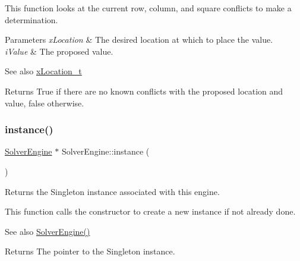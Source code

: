 This function looks at the current row, column, and square conflicts to make a determination. 
\begin{DoxyParams}{Parameters}
{\em x\+Location} & The desired location at which to place the value. \\
\hline
{\em i\+Value} & The proposed value. \\
\hline
\end{DoxyParams}
\begin{DoxySeeAlso}{See also}
\mbox{\hyperlink{struct_solver_engine_1_1x_location__t}{x\+Location\+\_\+t}} 
\end{DoxySeeAlso}
\begin{DoxyReturn}{Returns}
True if there are no known conflicts with the proposed location and value, false otherwise. 
\end{DoxyReturn}
\mbox{\label{class_solver_engine_abc1e088d35a6702a58c57e3344348eab}} 
\subsubsection{\texorpdfstring{instance()}{instance()}}
{\footnotesize\ttfamily \mbox{\hyperlink{class_solver_engine}{Solver\+Engine}} $\ast$ Solver\+Engine\+::instance (\begin{DoxyParamCaption}{ }\end{DoxyParamCaption})\hspace{0.3cm}{\ttfamily [static]}}



Returns the Singleton instance associated with this engine. 

This function calls the constructor to create a new instance if not already done. \begin{DoxySeeAlso}{See also}
\mbox{\hyperlink{class_solver_engine_a677b5fe26a9eea0dea994cc3f9027211}{Solver\+Engine()}} 
\end{DoxySeeAlso}
\begin{DoxyReturn}{Returns}
The pointer to the Singleton instance. 
\end{DoxyReturn}
\mbox{\label{class_solver_engine_a27aa053eb5e2a7abb602b7763ec6dea8}} 
